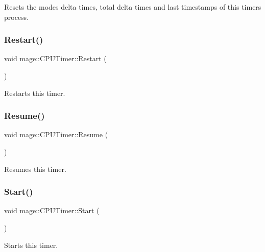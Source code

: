 Resets the modes\textquotesingle{} delta times, total delta times and last timestamps of this timer\textquotesingle{}s process. \hypertarget{classmage_1_1_c_p_u_timer_af9668358f3a1d6db3e0f1f608d269ec8}{}\label{classmage_1_1_c_p_u_timer_af9668358f3a1d6db3e0f1f608d269ec8} 
\subsubsection{\texorpdfstring{Restart()}{Restart()}}
{\footnotesize\ttfamily void mage\+::\+C\+P\+U\+Timer\+::\+Restart (\begin{DoxyParamCaption}{ }\end{DoxyParamCaption})}

Restarts this timer. \hypertarget{classmage_1_1_c_p_u_timer_ae82cf4b83a4968e24ef49961745acd79}{}\label{classmage_1_1_c_p_u_timer_ae82cf4b83a4968e24ef49961745acd79} 
\subsubsection{\texorpdfstring{Resume()}{Resume()}}
{\footnotesize\ttfamily void mage\+::\+C\+P\+U\+Timer\+::\+Resume (\begin{DoxyParamCaption}{ }\end{DoxyParamCaption})}

Resumes this timer. \hypertarget{classmage_1_1_c_p_u_timer_aa6ee4ede4066d447f4205d51bd0b8442}{}\label{classmage_1_1_c_p_u_timer_aa6ee4ede4066d447f4205d51bd0b8442} 
\subsubsection{\texorpdfstring{Start()}{Start()}}
{\footnotesize\ttfamily void mage\+::\+C\+P\+U\+Timer\+::\+Start (\begin{DoxyParamCaption}{ }\end{DoxyParamCaption})}

Starts this timer. \hypertarget{classmage_1_1_c_p_u_timer_a2fb7ae3c902fc590f48ed1c56e1cc447}{}\label{classmage_1_1_c_p_u_timer_a2fb7ae3c902fc590f48ed1c56e1cc447} 
